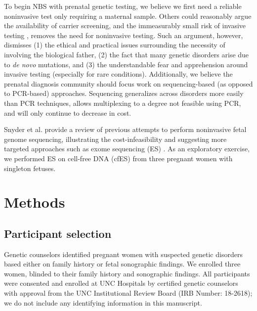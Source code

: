 \documentclass{article}\usepackage[]{graphicx}\usepackage[]{color}
\begin{document}
To begin NBS with prenatal genetic testing, we believe we first need a reliable noninvasive test only requiring a maternal sample.
Others could reasonably argue the availability of carrier screening, and the immeasurably small risk of invasive testing \cite{salomon:2019aa}, removes the need for noninvasive testing.
Such an argument, however, dismisses (1) the ethical and practical issues surrounding the necessity of involving the biological father, (2) the fact that many genetic disorders arise due to \textit{de novo} mutations, and (3) the understandable fear and apprehension around invasive testing (especially for rare conditions).
Additionally, we believe the prenatal diagnosis community should focus work on sequencing-based (as opposed to PCR-based) approaches.
Sequencing generalizes across disorders more easily than PCR techniques, allows multiplexing to a degree not feasible using PCR, and will only continue to decrease in cost.

Snyder et al. provide a review of previous attempts to perform noninvasive fetal genome sequencing, illustrating the cost-infeasibility and suggesting more targeted approaches such as exome sequencing (ES) \cite{snyder:2013aa,lo:2010aa,kitzman:2012aa,fan:2012aa}.
As an exploratory exercise, we performed ES on cell-free DNA (cfES) from three pregnant women with singleton fetuses.

\section{Methods}

\subsection{Participant selection}
Genetic counselors identified pregnant women with suspected genetic disorders based either on family history or fetal sonographic findings.
We enrolled three women, blinded to their family history and sonographic findings.
All participants were consented and enrolled at UNC Hospitals by certified genetic counselors with approval from the UNC Institutional Review Board (IRB Number: 18-2618); we do not include any identifying information in this manuscript.
\end{document}

